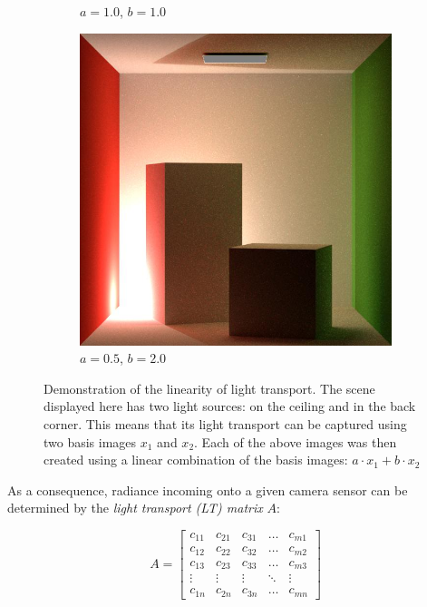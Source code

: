\begin{figure}[ht]
\begin{subfigure}[b]{0.24\textwidth}
        \caption*{\(a = 1.0\), \(b = 1.0\)}
    \end{subfigure}
    \hfill
    \begin{subfigure}[b]{0.24\textwidth}
        \centering
        \includegraphics[width=\textwidth]{images/02-linear_lt_comb2.jpg}
        \caption*{\(a = 0.5\), \(b = 2.0\)}
    \end{subfigure}
    \caption{Demonstration of the linearity of light transport. The scene displayed here has two light sources: on the ceiling and in the back corner. This means that its light transport can be captured using two basis images \(x_1\) and \(x_2\). Each of the above images was then created using a linear combination of the basis images: \(a \cdot x_1 + b \cdot x_2\)}
    \label{fig:background_linear_lt}
\end{figure}

As a consequence, radiance incoming onto a given camera sensor can be determined by the \textit{light transport (LT) matrix} \(A\):

\begin{equation}
    \label{eq:lt_matrix}
    A = \begin{bmatrix}
        c_{11} & c_{21} & c_{31} & \dots & c_{m1} \\
        c_{12} & c_{22} & c_{32} & \dots & c_{m2} \\
        c_{13} & c_{23} & c_{33} & \dots & c_{m3} \\
        \vdots & \vdots & \vdots & \ddots & \vdots \\
        c_{1n} & c_{2n} & c_{3n} & \dots & c_{mn}
    \end{bmatrix}
\end{equation}

